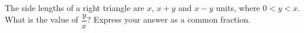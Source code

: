 The side lengths of a right triangle are $x$, $x+y$ and $x-y$ units, where $0<y<x$. What is the value of $\dfrac{y}{x}$? Express your answer as a common fraction.
